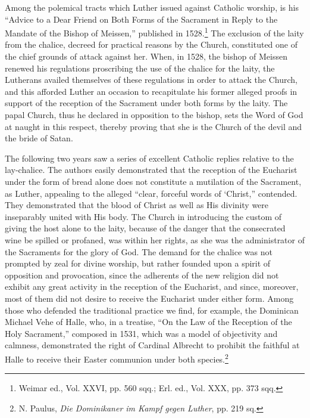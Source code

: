 Among the polemical tracts which Luther issued against Catholic
worship, is his “Advice to a Dear Friend on Both Forms of the Sacrament
in Reply to the Mandate of the Bishop of Meissen,” published in
1528.\footnote{Weimar ed., Vol. XXVI, pp. 560 sqq.; Erl. ed., Vol. XXX, pp. 373 sqq.}
The exclusion of the laity from the chalice, decreed for practical
reasons by the Church, constituted one of the chief grounds of
attack against her. When, in 1528, the bishop of Meissen renewed his
regulations proscribing the use of the chalice for the laity, the Lutherans
availed themselves of these regulations in order to attack the
Church, and this afforded Luther an occasion to recapitulate his former
alleged proofs in support of the reception of the Sacrament under
both forms by the laity. The papal Church, thus he declared in opposition
to the bishop, sets the Word of God at naught in this respect,
thereby proving that she is the Church of the devil and the bride of
Satan.

The following two years saw a series of excellent Catholic replies
relative to the lay-chalice. The authors easily demonstrated that the
reception of the Eucharist under the form of bread alone does not
constitute a mutilation of the Sacrament, as Luther, appealing to the
alleged “clear, forceful words of ‘Christ,” contended. They demonstrated
that the blood of Christ as well as His divinity were inseparably
united with His body. The Church in introducing the custom of
giving the host alone to the laity, because of the danger that the consecrated
wine be spilled or profaned, was within her rights, as she was
the administrator of the Sacraments for the glory of God. The demand for
the chalice was not prompted by zeal for divine worship,
but rather founded upon a spirit of opposition and provocation, since
the adherents of the new religion did not exhibit any great activity in
the reception of the Eucharist, and since, moreover, most of them did
not desire to receive the Eucharist under either form. Among those
who defended the traditional practice we find, for example, the Dominican
Michael Vehe of Halle, who, in a treatise, “On the Law of the
Reception of the Holy Sacrament,” composed in 1531, which was a
model of objectivity and calmness, demonstrated the right of Cardinal
Albrecht to prohibit the faithful at Halle to receive their Easter
communion under both species.\footnote{N. Paulus, \textit{Die Dominikaner im Kampf gegen Luther}, pp. 219 sq.}

